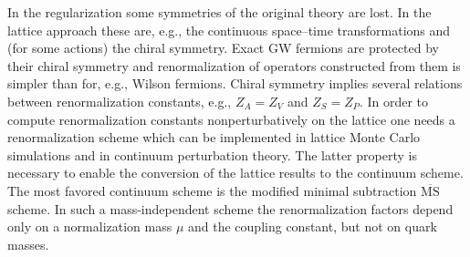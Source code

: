 In the regularization some symmetries of the original theory are lost. In
the lattice approach these are, e.g., the continuous space--time transformations
and (for some actions) the chiral symmetry. Exact GW fermions are protected
by their chiral symmetry and renormalization of operators constructed from
them is simpler than for, e.g., Wilson fermions. Chiral symmetry implies several relations between renormalization constants, e.g., $Z_A = Z_V$ and $Z_S = Z_P$.
In order to compute renormalization constants nonperturbatively on the
lattice one needs a renormalization scheme which can be implemented in lattice Monte Carlo simulations and in continuum perturbation theory. The latter
property is necessary to enable the conversion of the lattice results to the continuum scheme. The most favored continuum scheme is the modified minimal
subtraction $\overline{\mathrm{MS}}$ scheme. In such a mass-independent scheme the renormalization factors depend only on a normalization mass $\mu$ and the coupling constant,
but not on quark masses.

